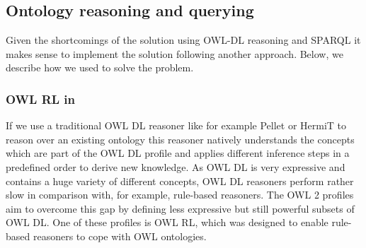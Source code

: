 \subsection{Ontology reasoning and querying}
Given the shortcomings of the solution using OWL-DL reasoning and SPARQL it makes sense to implement the solution following another approach. 
Below, we describe how we used \nthreelogic to solve the problem.

\subsubsection{OWL RL in \nthree}\label{owlrln3}
If we use a traditional OWL DL reasoner like for example Pellet \cite{Pellet} or HermiT \cite{hermit} to reason over an existing ontology 
this reasoner 
natively understands the concepts which are part of the OWL DL profile and applies 
different inference steps in a predefined order to derive new knowledge. %
%  
% 
% 
% 
% 
% 
As OWL DL is very expressive and contains a huge variety of different concepts, OWL DL reasoners perform rather slow in comparison with, for example, rule-based reasoners. 
The OWL 2 profiles \cite{OWLRL} aim to overcome this gap 
by defining less expressive
but still powerful subsets of OWL DL. One of these profiles is OWL RL, which was designed to enable rule-based reasoners to cope with OWL ontologies. 

